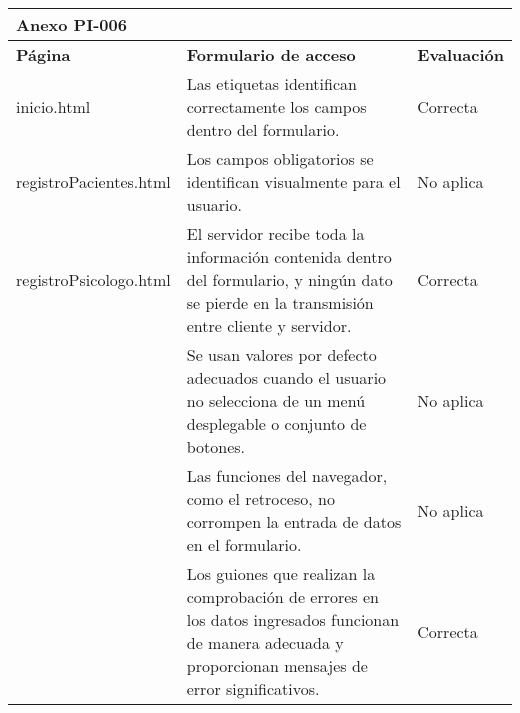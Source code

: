 \begin{table}[htpb]
\centering
\begin{tabularx}{\textwidth}{|l|X|l|}
\hline
\multicolumn{3}{|l|}{\textbf{Anexo PI-006}}                                                                                                                                                                                                                        \\ \hline
\textbf{Página}                                                                 & \textbf{Formulario de acceso}                                                                                                                             & \textbf{Evaluación} \\ \hline
inicio.html & Las etiquetas identifican correctamente los campos dentro del formulario.                                                                                 & Correcta            \\ \cline{2-3} 
registroPacientes.html                                                                                & Los campos obligatorios se identifican visualmente para el usuario.                                                                                       & No aplica           \\ \cline{2-3} 
 registroPsicologo.html                                                                               & El servidor recibe toda la información contenida dentro del formulario, y ningún dato se pierde en la transmisión entre cliente y servidor.               & Correcta            \\ \cline{2-3} 
                                                                                & Se usan valores por defecto adecuados cuando el usuario no selecciona de un menú desplegable o conjunto de botones.                                       & No aplica           \\ \cline{2-3} 
                                                                                & Las funciones del navegador, como el retroceso, no corrompen la entrada de datos en el formulario.                                                        & No aplica           \\ \cline{2-3} 
                                                                                & Los guiones que realizan la comprobación de errores en los datos ingresados funcionan de manera adecuada y proporcionan mensajes de error significativos. & Correcta            \\ \cline{2-3} 

\end{tabularx}
\end{table}
